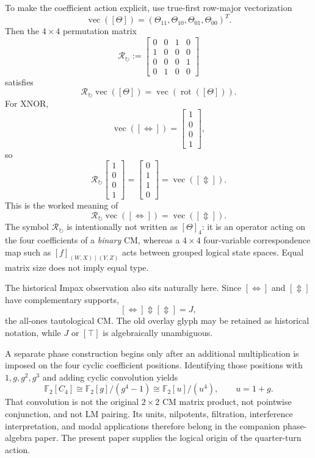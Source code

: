 \documentclass[11pt]{article}
\theoremstyle{definition}
\theoremstyle{remark}
\newcommand{\F}{\mathbb F}
\newcommand{\rot}{\operatorname{rot}}
\newcommand{\vecop}{\operatorname{vec}}
\newcommand{\xor}{\mathbin{\Updownarrow}}
\begin{document}
To make the coefficient action explicit, use true-first row-major vectorization
\[
 \vecop([\Theta])=(\Theta_{11},\Theta_{10},\Theta_{01},\Theta_{00})^T.
\]
Then the $4\times4$ permutation matrix
\begin{equation}
 \mathcal R_{\circlearrowright}:=
 \begin{bmatrix}
 0&0&1&0\\
 1&0&0&0\\
 0&0&0&1\\
 0&1&0&0
 \end{bmatrix}
 \label{eq:rhoquarter}
\end{equation}
satisfies
\[
 \mathcal R_{\circlearrowright}\vecop([\Theta])
 =\vecop(\rot([\Theta])).
\]
For XNOR,
\[
 \vecop([\Leftrightarrow])=
 \begin{bmatrix}1\\0\\0\\1\end{bmatrix},
\]
so
\[
 \mathcal R_{\circlearrowright}
 \begin{bmatrix}1\\0\\0\\1\end{bmatrix}
 =
 \begin{bmatrix}0\\1\\1\\0\end{bmatrix}
 =\vecop([\Updownarrow]).
\]
This is the worked meaning of
\[
 \mathcal R_{\circlearrowright}\vecop([\Leftrightarrow])
 =\vecop([\Updownarrow]).
\]
The symbol $\mathcal R_{\circlearrowright}$ is intentionally not written as $[\Theta]_4$: it is an operator acting on the four coefficients of a \emph{binary} CM, whereas a $4\times4$ four-variable correspondence map such as $[f]_{(W,X)\mid(Y,Z)}$ acts between grouped logical state spaces.  Equal matrix size does not imply equal type.

The historical Impax observation also sits naturally here.  Since $[\Leftrightarrow]$ and $[\Updownarrow]$ have complementary supports,
\[
 [\Leftrightarrow]\xor[\Updownarrow]=J,
\]
the all-ones tautological CM.  The old overlay glyph may be retained as historical notation, while $J$ or $[\top]$ is algebraically unambiguous.

A separate phase construction begins only after an additional multiplication is imposed on the four cyclic coefficient positions.  Identifying those positions with $1,g,g^2,g^3$ and adding cyclic convolution yields
\[
 \F_2[C_4]\cong\F_2[g]/(g^4-1)
 \cong\F_2[u]/(u^4),\qquad u=1+g.
\]
That convolution is not the original $2\times2$ CM matrix product, not pointwise conjunction, and not LM pairing.  Its units, nilpotents, filtration, interference interpretation, and modal applications therefore belong in the companion phase-algebra paper.  The present paper supplies the logical origin of the quarter-turn action.
\end{document}
